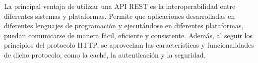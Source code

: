 La principal ventaja de utilizar una API REST es la interoperabilidad entre diferentes sistemas y plataformas. Permite que aplicaciones desarrolladas en diferentes lenguajes de programación y ejecutándose en diferentes plataformas, puedan comunicarse de manera fácil, eficiente y consistente. Además, al seguir los principios del protocolo HTTP, se aprovechan las características y funcionalidades de dicho protocolo, como la caché, la autenticación y la seguridad.

